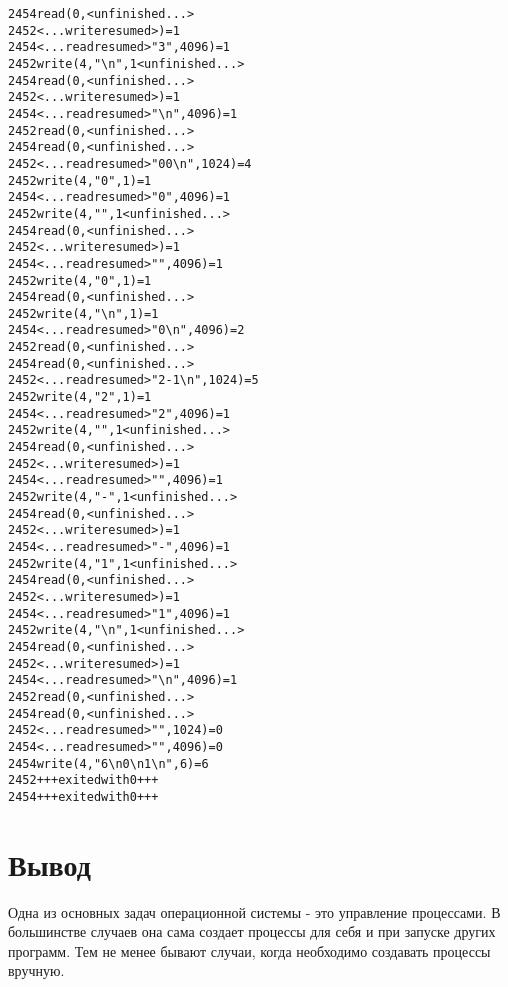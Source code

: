 \documentclass[pdf, unicode, 12pt, a4paper,oneside,fleqn]{article}
\begin{document}
\begin{alltt}
2454  read(0,  <unfinished ...>
2452  <... write resumed>)              = 1
2454  <... read resumed>"3", 4096)      = 1
2452  write(4, "\textbackslash{n}", 1 <unfinished ...>
2454  read(0,  <unfinished ...>
2452  <... write resumed>)              = 1
2454  <... read resumed>"\textbackslash{n}", 4096)     = 1
2452  read(0,  <unfinished ...>
2454  read(0,  <unfinished ...>
2452  <... read resumed>"0 0\textbackslash{n}", 1024)  = 4
2452  write(4, "0", 1)                  = 1
2454  <... read resumed>"0", 4096)      = 1
2452  write(4, " ", 1 <unfinished ...>
2454  read(0,  <unfinished ...>
2452  <... write resumed>)              = 1
2454  <... read resumed>" ", 4096)      = 1
2452  write(4, "0", 1)                  = 1
2454  read(0,  <unfinished ...>
2452  write(4, "\textbackslash{n}", 1)                 = 1
2454  <... read resumed>"0\textbackslash{n}", 4096)    = 2
2452  read(0,  <unfinished ...>
2454  read(0,  <unfinished ...>
2452  <... read resumed>"2 -1\textbackslash{n}", 1024) = 5
2452  write(4, "2", 1)                  = 1
2454  <... read resumed>"2", 4096)      = 1
2452  write(4, " ", 1 <unfinished ...>
2454  read(0,  <unfinished ...>
2452  <... write resumed>)              = 1
2454  <... read resumed>" ", 4096)      = 1
2452  write(4, "-", 1 <unfinished ...>
2454  read(0,  <unfinished ...>
2452  <... write resumed>)              = 1
2454  <... read resumed>"-", 4096)      = 1
2452  write(4, "1", 1 <unfinished ...>
2454  read(0,  <unfinished ...>
2452  <... write resumed>)              = 1
2454  <... read resumed>"1", 4096)      = 1
2452  write(4, "\textbackslash{n}", 1 <unfinished ...>
2454  read(0,  <unfinished ...>
2452  <... write resumed>)              = 1
2454  <... read resumed>"\textbackslash{n}", 4096)     = 1
2452  read(0,  <unfinished ...>
2454  read(0,  <unfinished ...>
2452  <... read resumed>"", 1024)       = 0
2454  <... read resumed>"", 4096)       = 0
2454  write(4, "6\textbackslash{n}0\textbackslash{n}1\textbackslash{n}", 6)          = 6
2452  +++ exited with 0 +++
2454  +++ exited with 0 +++
\end{alltt}

\pagebreak

\section{Вывод}

Одна из основных задач операционной системы - это управление процессами.
В большинстве случаев она сама создает процессы для себя и при запуске других программ.
Тем не менее бывают случаи, когда необходимо создавать процессы вручную.
\end{document}
